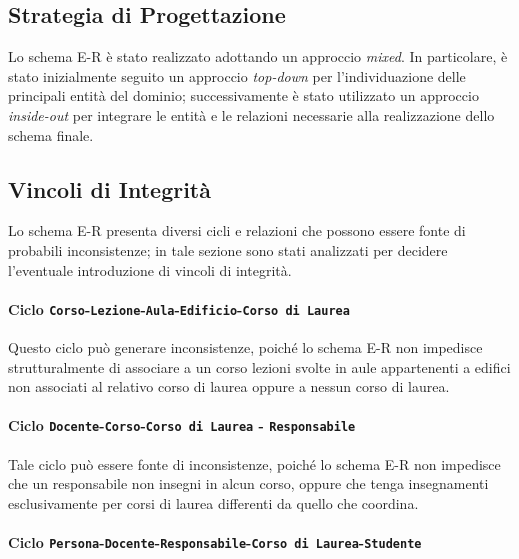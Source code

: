 \documentclass[a4paper,11pt]{article}
\begin{document}
\subsection{Strategia di Progettazione}

Lo schema E-R è stato realizzato adottando un approccio \emph{mixed}. In particolare, è stato inizialmente seguito un approccio \emph{top-down} per l'individuazione delle principali entità del dominio; successivamente è stato utilizzato un approccio \emph{inside-out} per integrare le entità e le relazioni necessarie alla realizzazione dello schema finale.


\subsection{Vincoli di Integrità}

Lo schema E-R presenta diversi cicli e relazioni che possono essere fonte di probabili inconsistenze; in tale sezione sono stati analizzati per decidere l'eventuale introduzione di vincoli di integrità.


\paragraph{Ciclo \texttt{Corso}-\texttt{Lezione}-\texttt{Aula}-\texttt{Edificio}-\texttt{Corso di Laurea}}
\label{cycle:course_lesson_room_building_degree}

Questo ciclo può generare inconsistenze, poiché lo schema E-R non impedisce strutturalmente di associare a un corso lezioni svolte in aule appartenenti a edifici non associati al relativo corso di laurea oppure a nessun corso di laurea.


\paragraph{Ciclo \texttt{Docente}-\texttt{Corso}-\texttt{Corso di Laurea} - \texttt{Responsabile}}
\label{cycle:teacher_course_degree_resp}

Tale ciclo può essere fonte di inconsistenze, poiché lo schema E-R non impedisce che un responsabile non insegni in alcun corso, oppure che tenga insegnamenti esclusivamente per corsi di laurea differenti da quello che coordina.


\paragraph{Ciclo \texttt{Persona}-\texttt{Docente}-\texttt{Responsabile}-\texttt{Corso di Laurea}-\texttt{Studente}}
\label{cycle:person_teacher_resp_degree_student}
\end{document}
